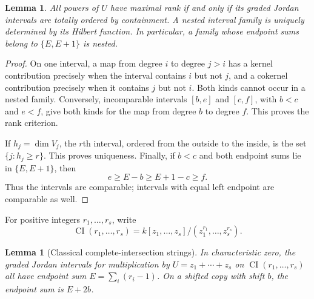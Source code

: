 \documentclass[11pt]{amsart}
\newtheorem{lemma}[theorem]{Lemma}
\theoremstyle{definition}
\newcommand{\CI}{\operatorname{CI}}
\begin{document}
\begin{lemma}\label{lem:nested}
All powers of $U$ have maximal rank if and only if its graded Jordan
intervals are totally ordered by containment. A nested interval family is
uniquely determined by its Hilbert function. In particular, a family whose
endpoint sums belong to $\{E,E+1\}$ is nested.
\end{lemma}

\begin{proof}
On one interval, a map from degree $i$ to degree $j>i$ has a kernel
contribution precisely when the interval contains $i$ but not $j$, and a
cokernel contribution precisely when it contains $j$ but not $i$.
Both kinds cannot occur in a nested family. Conversely, incomparable
intervals $[b,e]$ and $[c,f]$, with $b<c$ and $e<f$, give both kinds for
the map from degree $b$ to degree $f$. This proves the rank criterion.

If $h_j=\dim V_j$, the $r$th interval, ordered from the outside to the
inside, is the set $\{j:h_j\ge r\}$. This proves uniqueness. Finally,
if $b<c$ and both endpoint sums lie in $\{E,E+1\}$, then
\[
 e\ge E-b\ge E+1-c\ge f.
\]
Thus the intervals are comparable; intervals with equal left endpoint
are comparable as well.
\end{proof}

For positive integers $r_1,\ldots,r_s$, write
\[
 \CI(r_1,\ldots,r_s)
 =k[z_1,\ldots,z_s]/(z_1^{r_1},\ldots,z_s^{r_s}).
\]

\begin{lemma}[Classical complete-intersection strings]\label{lem:ci}
In characteristic zero, the graded Jordan intervals for multiplication by
$U=z_1+\cdots+z_s$ on $\CI(r_1,\ldots,r_s)$ all have endpoint sum
$E=\sum_i(r_i-1)$. On a shifted copy with shift $b$, the endpoint sum
is $E+2b$.
\end{lemma}
\end{document}

